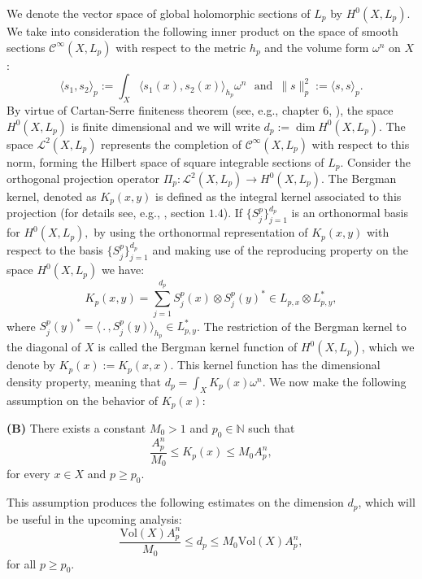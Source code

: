 \documentclass[11pt,leqno,oneside]{amsart}
\numberwithin{equation}{section}
\begin{document}
We denote the vector space of global holomorphic sections of $L_p$ by $H^{0}(X, L_{p})$. We take into consideration the following inner product on the space of smooth sections $\mathscr{C}^{\infty}(X,L_{p})$  with respect to the metric $h_{p}$ and the volume form $\omega^{n}$ on $X$:
\begin{equation*}
\big\langle s_{1}, s_{2} \big\rangle_{p}:=\int_{X}{\big \langle s_{1}(x), s_{2}(x) \big \rangle_{h_{p}} \omega^{n}}\, \,\, \,\text{and}\,\,\, \|s\|^{2}_{p}:=\big\langle s, s \big\rangle_{p}.\end{equation*}
By virtue of Cartan-Serre finiteness theorem (see, e.g., chapter 6, \cite{GR3}), the space $H^{0}(X, L_{p})$ is finite dimensional and we will write $d_{p}:= \dim{H^{0}(X, L_{p})}$. The space $\mathcal{L}^{2}(X, L_{p})$ represents the completion of $\mathscr{C}^{\infty}(X,L_{p})$ with respect to this norm, forming the Hilbert space of square integrable sections of $L_{p}$. Consider the orthogonal projection operator  $\Pi_{p}: \mathcal{L}^{2}(X, L_{p})\rightarrow H^{0}(X, L_{p}).$  The Bergman kernel, denoted as $K_{p}(x, y)$ is defined as the integral kernel associated to this projection (for details see, e.g., \cite{MM1}, section $1.4$). If $\{S^{p}_{j} \}_{j=1}^{d_{p}}$ is an orthonormal basis for $H^{0}(X, L_{p}),$ by using the orthonormal representation of $K_{p}(x, y)$ with respect to the basis $\{S^{p}_{j} \}_{j=1}^{d_{p}}$ and making use of the reproducing property on the space $H^{0}(X, L_{p})$ we have: $$K_{p}(x, y)=\sum_{j=1}^{d_{p}}{S^{p}_{j}(x)\otimes S^{p}_{j}(y)^{*}}\in L_{p, x}\otimes L_{p, y}^{*},$$where $S^{p}_{j}(y)^{*}=\langle \, .\,, S^{p}_{j}(y)\rangle_{h_{p}}\in L^{*}_{p, y}$. The restriction of the Bergman kernel to the diagonal of \( X \) is called the Bergman kernel function of \( H^{0}(X, L_{p}) \), which we denote by \( K_{p}(x) := K_{p}(x, x) \). This kernel function has the dimensional density property, meaning that \( d_{p} = \int_{X} K_{p}(x) \omega^{n} \). We now make the following assumption on the behavior of \( K_{p}(x) \):


	\textbf{(B)} There exists a constant \( M_{0} > 1 \) and \( p_{0} \in \mathbb{N} \) such that
	\begin{equation}\label{0.11}
		\frac{A_{p}^{n}}{M_{0}} \leq K_{p}(x) \leq M_{0} A_{p}^{n},
	\end{equation}
	for every \( x \in X \) and \( p \geq p_{0} \).

This assumption produces the following estimates on the dimension \( d_{p} \), which will be useful in the upcoming analysis:
\begin{equation}\label{dim}
	\frac{\mathrm{Vol}(X) A_{p}^{n}}{M_{0}} \leq d_{p} \leq M_{0} \mathrm{Vol}(X) A_{p}^{n},
\end{equation}
for all \( p \geq p_{0} \).
\end{document}
